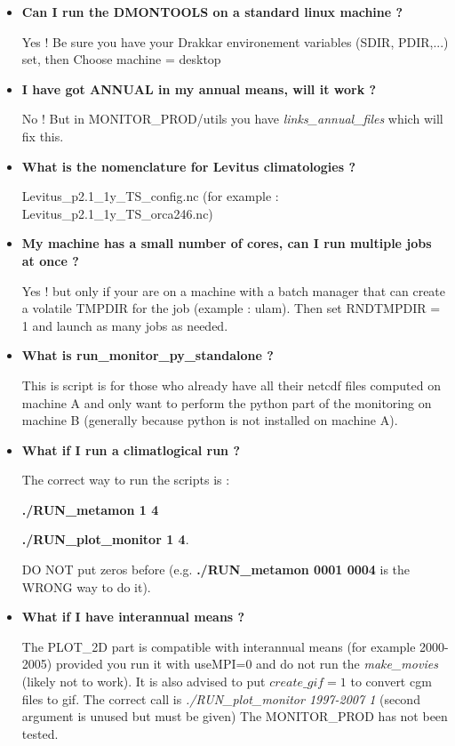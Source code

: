 \documentclass[a4paper,11pt]{article}
\begin{document}
\begin{itemize}
\item \textbf{Can I run the DMONTOOLS on a standard linux machine ?}

Yes ! Be sure you have your Drakkar environement variables (SDIR, PDIR,...) set, then Choose machine = desktop

\item \textbf{I have got ANNUAL in my annual means, will it work ?}

No ! But in MONITOR\_PROD/utils you have \textit{links\_annual\_files} which will fix this.

\item \textbf{What is the nomenclature for Levitus climatologies ?}

Levitus\_p2.1\_1y\_TS\_config.nc (for example : Levitus\_p2.1\_1y\_TS\_orca246.nc)

\item \textbf{My machine has a small number of cores, can I run multiple jobs at once ?}

Yes ! but only if your are on a machine with a batch manager that can create a volatile TMPDIR for the job
(example : ulam). Then set RNDTMPDIR = 1 and launch as many jobs as needed. 

\item \textbf{What is run\_monitor\_py\_standalone ?}

This is script is for those who already have all their netcdf files computed on machine A and only want to
perform the python part of the monitoring on machine B (generally because python is not installed on machine A).

\item \textbf{What if I run a climatlogical run ?}

The correct way to run the scripts is :

\textbf{./RUN\_meta\-mon 1 4} 

\textbf{./RUN\_plot\_moni\-tor 1 4}.

DO NOT put zeros before (e.g. \textbf{./RUN\_metamon 0001 0004} is the WRONG way to do it).

\item \textbf{What if I have interannual means ?}

The PLOT\_2D part is compatible with interannual means (for example 2000-2005) provided
you run it with useMPI=0 and do not run the \textit{make\_movies} (likely not to work).
It is also advised to put $create\_gif = 1$ to convert cgm files to gif.
The correct call is \textit{./RUN\_plot\_monitor 1997-2007 1} (second argument is unused but must be given)
The MONITOR\_PROD has not been tested.


\end{itemize}
\end{document}
